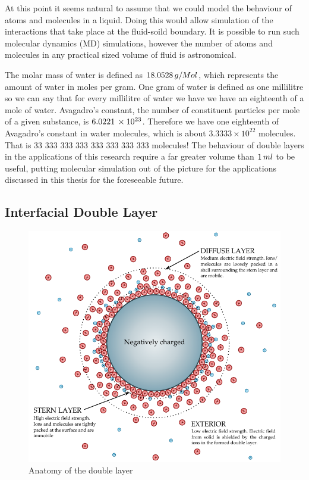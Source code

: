 {At this point it seems natural to assume that we could model the behaviour of atoms and molecules in a liquid. Doing this would allow simulation of the interactions that take place at the fluid-soild boundary. It is possible to run such molecular dynamics (MD) simulations, however the number of atoms and molecules in any practical sized volume of fluid is astronomical.

The molar mass of water is defined as $18.0528\thinspace g/Mol$, which represents the amount of water in moles per gram. One gram of water is defined as one millilitre so we can say that for every millilitre of water we have we have an eighteenth of a mole of water. Avagadro's constant, the number of constituent particles per mole of a given substance, is $6.0221\thinspace \times 10^{23}$. Therefore we have one eighteenth of Avagadro's constant in water molecules, which is about $3.3333\times 10^{22}$ molecules. That is 33 333 333 333 333 333 333 333 molecules! The behaviour of double layers in the applications of this research require a far greater volume than $1\thinspace ml$ to be useful, putting molecular simulation out of the picture for the applications discussed in this thesis for the foreseeable future.

\subsection{Interfacial Double Layer}

\begin{figure}
    \begin{center}
        \includegraphics{content/introduction/graphics/doubleLayer_labelled.pdf}
    \end{center}
    \caption{Anatomy of the double layer}
    \label{fig:doubleLayer_anatomy}
\end{figure}

}
